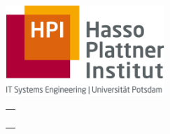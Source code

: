 \newenvironment{myepigraph}
  {\par\hfill
   \begin{tabular}{@{}r@{\hspace{13em}}}}
  {\end{tabular}\par\medskip}

\begin{titlepage}
	\begin{addmargin}[-1cm]{-3cm}
    \begin{center}
        \hfill

        \vfill

        \begingroup
          \color{Maroon}\spacedallcaps{\myTitle} \\
          \color{Black}\spacedlowsmallcaps{\mySubtitle}\\[1em]
          \color{Maroon}\spacedallcaps{\myTitleGer}\\
          \color{Black}\spacedlowsmallcaps{\mySubtitleGer}
          \\[3em]
        \endgroup

        {\color{Black}\spacedlowsmallcaps{\myName}\\
        \spacedlowsmallcaps{\myTime}}

        \hfill



        \vfill

        \includegraphics[width=6cm]{gfx/logo.jpg} \\[2ex]
        \begin{myepigraph}
        \spacedlowsmallcaps{Supervised by}\\
        \myProf\\
        \mySupervisorA\\
        \mySupervisorB\\
        \spacedlowsmallcaps{\myFaculty}
        \end{myepigraph}

        \vfill

    \end{center}
  \end{addmargin}
\end{titlepage}